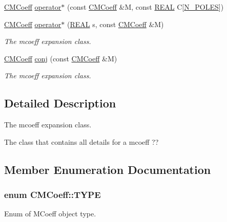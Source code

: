 \begin{DoxyCompactItemize}
\hyperlink{classCMCoeff}{C\-M\-Coeff} \hyperlink{classCMCoeff_a794db3eaa0d9cf84e4c8ca1023e4f54a}{operator$\ast$} (const \hyperlink{classCMCoeff}{C\-M\-Coeff} \&M, const \hyperlink{util_8h_a5821460e95a0800cf9f24c38915cbbde}{R\-E\-A\-L} C\mbox{[}\hyperlink{mcoeff_8h_ac23f9c13c5d07d9ce386f7a830c35e5a}{N\-\_\-\-P\-O\-L\-E\-S}\mbox{]})
\item 
\hyperlink{classCMCoeff}{C\-M\-Coeff} \hyperlink{classCMCoeff_a4bebac156440468c712dfce37bc9fc7c}{operator$\ast$} (\hyperlink{util_8h_a5821460e95a0800cf9f24c38915cbbde}{R\-E\-A\-L} s, const \hyperlink{classCMCoeff}{C\-M\-Coeff} \&M)
\begin{DoxyCompactList}\small\item\em The mcoeff expansion class. \end{DoxyCompactList}\item 
\hyperlink{classCMCoeff}{C\-M\-Coeff} \hyperlink{classCMCoeff_a33f855dbf0c86d35853f618e3494db87}{conj} (const \hyperlink{classCMCoeff}{C\-M\-Coeff} \&M)
\begin{DoxyCompactList}\small\item\em The mcoeff expansion class. \end{DoxyCompactList}\end{DoxyCompactItemize}


\subsection{Detailed Description}
The mcoeff expansion class. 

The class that contains all details for a mcoeff ?? 

\subsection{Member Enumeration Documentation}
\hypertarget{classCMCoeff_a0b490eeb5ba86bc1a95ea1c3b2946478}{
\subsubsection[{T\-Y\-P\-E}]{\setlength{\rightskip}{0pt plus 5cm}enum {\bf C\-M\-Coeff\-::\-T\-Y\-P\-E}}}\label{classCMCoeff_a0b490eeb5ba86bc1a95ea1c3b2946478}


Enum of M\-Coeff object type. 

